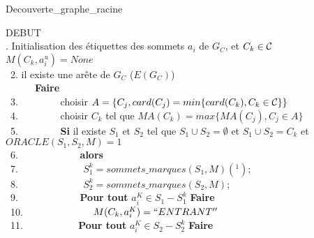 \begin{algorithm}
\caption{Decouverte\_graphe\_racine}
\noindent DEBUT\\
. Initialisation des \'etiquettes des sommets $a_i$ de $G_C$, et $C_k \in {\cal C}$ \\
\noindent $M( C_k, a_i^u) = None$ \\
~2.  il existe une  ar\^ete de $G_C$ ($E(G_C)$) \\
	\indent~~~~~~{\bf Faire}\\
~3.		\indent~~~~~~~~choisir $A = \{C_j , card(C_j) = min\{ card(C_k), C_k \in {\cal C} \}\}$ \\
~4.		\indent~~~~~~~~choisir $C_k$ tel que $MA(C_k) = max\{ MA(C_j), C_j \in A\} $ \\
~5.       	\indent~~~~~~~~{\bf Si} il existe $S_1$ et $S_2$ tel que $S_1 \cup S_2 = \emptyset $ et $S_1 \cup S_2 = C_k $ et $ORACLE(S_1, S_2, M )= 1 $ \\
~6.	       	\indent~~~~~~~~~~~~{\bf alors}\\
~7.	       	\indent~~~~~~~~~~~~ $S_1^k = sommets\_marques(S_1, M)(^1)$; \\
~8.	       	\indent~~~~~~~~~~~~ $S_2^k = sommets\_marques(S_2, M)$; \\
~9.		\indent ~~~~~~~~~~~~{\bf Pour tout} $a_i^K \in S_1 - S_1^k$ {\bf Faire} \\
~10.		\indent ~~~~~~~~~~~~~ $M(C_k, a_i^K) = ``ENTRANT''$ \\
~11.		\indent ~~~~~~~~~~ {\bf Pour tout} $a_i^K \in S_2 - S_2^k$ {\bf Faire} \\

\end{algorithm}

